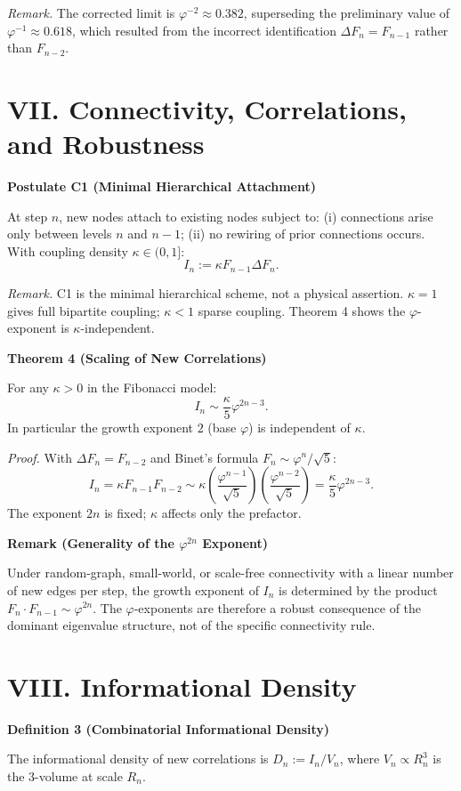 \documentclass[12pt]{article}
\newcommand{\ph}{\varphi}
\begin{document}
\textit{Remark.} The corrected limit is $\ph^{-2}\approx 0.382$, superseding the preliminary value of $\ph^{-1}\approx 0.618$, which resulted from the incorrect identification $\Delta F_n=F_{n-1}$ rather than $F_{n-2}$.

\section*{VII. Connectivity, Correlations, and Robustness}
\textbf{Postulate C1 (Minimal Hierarchical Attachment)}

At step $n$, new nodes attach to existing nodes subject to: (i) connections arise only between levels $n$ and $n-1$; (ii) no rewiring of prior connections occurs. With coupling density $\kappa\in(0,1]$:
\[
I_n:=\kappa F_{n-1}\Delta F_n.
\]

\textit{Remark.} C1 is the minimal hierarchical scheme, not a physical assertion. $\kappa=1$ gives full bipartite coupling; $\kappa<1$ sparse coupling. Theorem 4 shows the $\ph$-exponent is $\kappa$-independent.

\textbf{Theorem 4 (Scaling of New Correlations)}

For any $\kappa>0$ in the Fibonacci model:
\[
I_n\sim \frac{\kappa}{5}\ph^{2n-3}.
\]
In particular the growth exponent $2$ (base $\ph$) is independent of $\kappa$.

\textit{Proof.} With $\Delta F_n=F_{n-2}$ and Binet's formula $F_n\sim \ph^n/\sqrt{5}$:
\[
I_n=\kappa F_{n-1}F_{n-2}\sim \kappa\left(\frac{\ph^{n-1}}{\sqrt{5}}\right)\left(\frac{\ph^{n-2}}{\sqrt{5}}\right)=\frac{\kappa}{5}\ph^{2n-3}.
\]
The exponent $2n$ is fixed; $\kappa$ affects only the prefactor.

\textbf{Remark (Generality of the $\ph^{2n}$ Exponent)}

Under random-graph, small-world, or scale-free connectivity with a linear number of new edges per step, the growth exponent of $I_n$ is determined by the product $F_n\cdot F_{n-1}\sim \ph^{2n}$. The $\ph$-exponents are therefore a robust consequence of the dominant eigenvalue structure, not of the specific connectivity rule.

\section*{VIII. Informational Density}
\textbf{Definition 3 (Combinatorial Informational Density)}

The informational density of new correlations is $D_n:=I_n/V_n$, where $V_n\propto R_n^3$ is the 3-volume at scale $R_n$.
\end{document}
